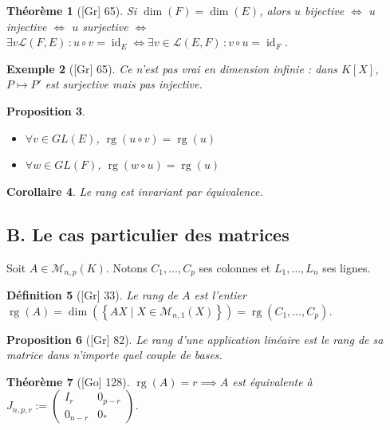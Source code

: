 \documentclass[10pt, a4paper, parskip=full, twoside, twocolumn]{report}
\newtheorem{definition}{Définition}
\newtheorem{theorem}[definition]{Théorème}
\newtheorem{proposition}[definition]{Proposition}
\newtheorem{corollary}[definition]{Corollaire}
\newtheorem{example}[definition]{Exemple}
\newcommand{\M}{\mathcal{M}}
\DeclareMathOperator{\rg}{rg}
\DeclareMathOperator{\id}{id}
\begin{document}
\begin{theorem}[\textnormal{[Gr] 65}]
	Si $\dim(F) = \dim(E)$, alors $u$ bijective $\iff$ $u$ injective 
	$\iff$ $u$ surjective $\iff$ $\exists v\mathcal{L}(F,E)\,\colon u\circ v = \id_E \iff \exists v\in \mathcal{L}(E,F)\,\colon v\circ u = \id_F$.
\end{theorem}

\begin{example}[\textnormal{[Gr] 65}]
	Ce n'est pas vrai en dimension infinie : dans $K[X]$, $P\mapsto P'$ est 
	surjective mais pas injective.
\end{example}

\begin{proposition}
	\begin{itemize}
		\item $\forall v\in GL(E)$, $\rg(u\circ v) = \rg(u)$
		\item $\forall w \in GL(F)$, $\rg(w\circ u) = \rg(u)$
	\end{itemize}
\end{proposition}

\begin{corollary}
	Le rang est invariant par équivalence.
\end{corollary}

\subsection*{B. Le cas particulier des matrices}
\textcolor{paragraphtext}{Soit $A\in\M_{n,p}(K)$. Notons $C_1,\dots, C_p$ ses colonnes et $L_1,\dots, L_n$ ses lignes.}

\begin{definition}[\textnormal{[Gr] 33}]
	Le \emph{rang de $A$} est l'entier $\rg(A) = \dim\left(\left\{AX\mid X\in\M_{n,1}(X)\right\}\right) = \rg(C_1,\dots,C_p)$.
\end{definition}

\begin{proposition}[\textnormal{[Gr] 82}]
	Le rang d'une application linéaire est le rang de sa matrice dans n'importe quel couple de bases.
\end{proposition}

\begin{theorem}[\textnormal{[Go] 128}]
	$\rg(A) = r\implies A$ est équivalente à $J_{n,p,r} := \begin{pmatrix}
		I_r & 0_{p-r} \\ 0_{n-r} & 0_*
	\end{pmatrix}$.
\end{theorem}
\end{document}
